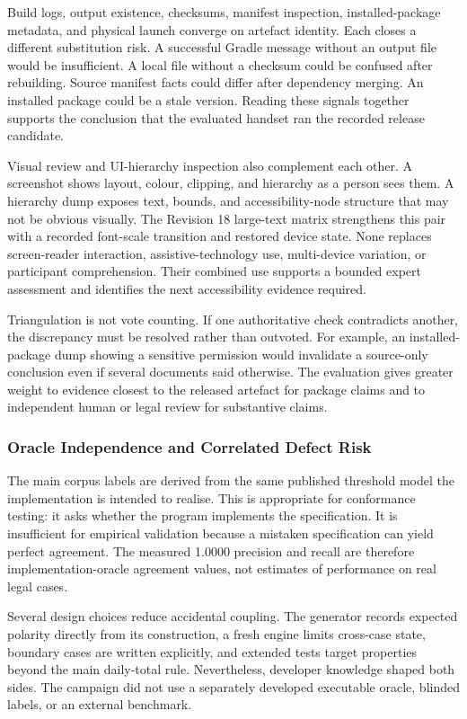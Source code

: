 Build logs, output existence, checksums, manifest inspection, installed-package metadata, and physical launch converge on artefact identity. Each closes a different substitution risk. A successful Gradle message without an output file would be insufficient. A local file without a checksum could be confused after rebuilding. Source manifest facts could differ after dependency merging. An installed package could be a stale version. Reading these signals together supports the conclusion that the evaluated handset ran the recorded release candidate.

Visual review and UI-hierarchy inspection also complement each other. A screenshot shows layout, colour, clipping, and hierarchy as a person sees them. A hierarchy dump exposes text, bounds, and accessibility-node structure that may not be obvious visually. The Revision 18 large-text matrix strengthens this pair with a recorded font-scale transition and restored device state. None replaces screen-reader interaction, assistive-technology use, multi-device variation, or participant comprehension. Their combined use supports a bounded expert assessment and identifies the next accessibility evidence required.

Triangulation is not vote counting. If one authoritative check contradicts another, the discrepancy must be resolved rather than outvoted. For example, an installed-package dump showing a sensitive permission would invalidate a source-only conclusion even if several documents said otherwise. The evaluation gives greater weight to evidence closest to the released artefact for package claims and to independent human or legal review for substantive claims.

\subsubsection{Oracle Independence and Correlated Defect Risk}

The main corpus labels are derived from the same published threshold model the implementation is intended to realise. This is appropriate for conformance testing: it asks whether the program implements the specification. It is insufficient for empirical validation because a mistaken specification can yield perfect agreement. The measured 1.0000 precision and recall are therefore implementation-oracle agreement values, not estimates of performance on real legal cases.

Several design choices reduce accidental coupling. The generator records expected polarity directly from its construction, a fresh engine limits cross-case state, boundary cases are written explicitly, and extended tests target properties beyond the main daily-total rule. Nevertheless, developer knowledge shaped both sides. The campaign did not use a separately developed executable oracle, blinded labels, or an external benchmark.

